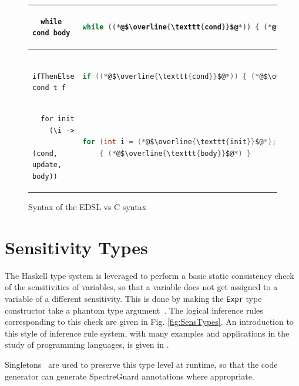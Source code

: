 \documentclass[10pt, conference]{IEEEtran}
\newcommand{\ttt}{\texttt}
\begin{document}
\begin{figure}[h]
\begin{tabular}{|l|l|}
  \hline
  \begin{lstlisting}
  while cond body
  \end{lstlisting}
  & \begin{lstlisting}[language=C]
  while ((*@$\overline{\ttt{cond}}$@*)) { (*@$\overline{\ttt{body}}$@*) }
  \end{lstlisting}\\

  \hline
  \begin{lstlisting}
  ifThenElse cond t f
  \end{lstlisting}
  & \begin{lstlisting}[language=C]
  if ((*@$\overline{\ttt{cond}}$@*)) { (*@$\overline{\ttt{t}}$@*) } else { (*@$\overline{\ttt{f}}$@*) }
  \end{lstlisting}\\

  \hline
  \begin{lstlisting}
  for init
    (\i ->
      (cond, update, body))
  \end{lstlisting}
  & \begin{lstlisting}[language=C]
  for (int i = (*@$\overline{\ttt{init}}$@*); (*@$\overline{\ttt{cond}}$@*); (*@$\overline{\ttt{update}}$@*))
    { (*@$\overline{\ttt{body}}$@*) }
  \end{lstlisting}\\


  \hline
\end{tabular}
\caption{Syntax of the EDSL vs C syntax}
\label{fig:Syntax}
\end{figure}

\section{Sensitivity Types}
The Haskell type system is leveraged to perform a basic static consistency check of the sensitivities
of variables, so that a variable does not get assigned to a variable of a different sensitivity. This
is done by making the \verb|Expr| type constructor take a phantom type argument~\cite{Phantom}. The
logical inference rules corresponding to this check are given in Fig. \ref{fig:SensTypes}. An introduction
to this style of inference rule system, with many examples and applications in the study of programming languages, is given in \cite{HarperFoundations}.

Singletons~\cite{SingletonsPaper} are used to preserve this type level at runtime, so that the
code generator can generate SpectreGuard annotations where appropriate.
\end{document}
